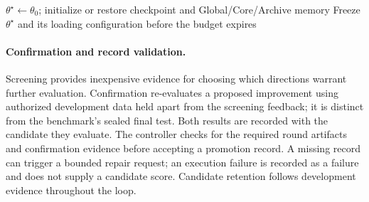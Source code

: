 \par\begingroup\centering
\begin{minipage}{0.95\linewidth}
\begin{algorithm}[H]
\small
\DontPrintSemicolon
{}
\SetAlgoLined
{}
\caption{MMResearch seven-step research loop}
\label{alg:mmresearch-loop}
$\theta^\star \leftarrow \theta_0$; initialize or restore checkpoint and Global/Core/Archive memory\;
Freeze $\theta^\star$ and its loading configuration before the budget expires\;
\;
\end{algorithm}
\end{minipage}\par
\endgroup


\paragraph{Confirmation and record validation.}
Screening provides inexpensive evidence for choosing which directions warrant further evaluation. Confirmation re-evaluates a proposed improvement using authorized development data held apart from the screening feedback; it is distinct from the benchmark's sealed final test. Both results are recorded with the candidate they evaluate. The controller checks for the required round artifacts and confirmation evidence before accepting a promotion record. A missing record can trigger a bounded repair request; an execution failure is recorded as a failure and does not supply a candidate score. Candidate retention follows development evidence throughout the loop.

